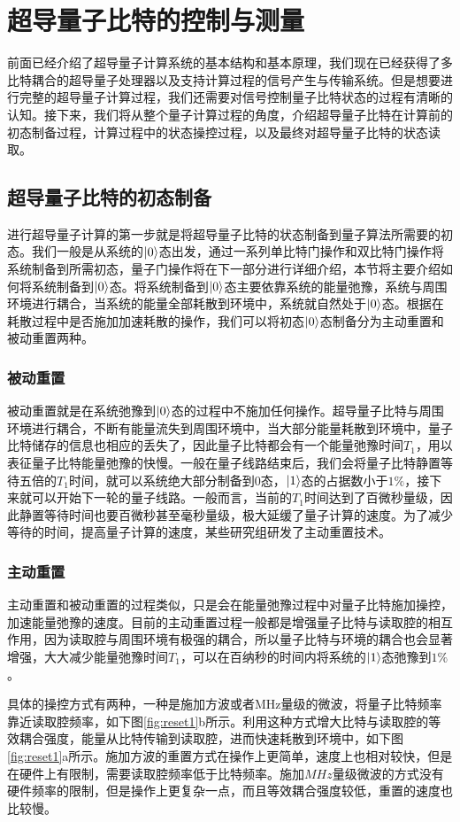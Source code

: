 \chapter{超导量子比特的控制与测量}
前面已经介绍了超导量子计算系统的基本结构和基本原理，我们现在已经获得了多比特耦合的超导量子处理器以及支持计算过程的信号产生与传输系统。但是想要进行完整的超导量子计算过程，我们还需要对信号控制量子比特状态的过程有清晰的认知。接下来，我们将从整个量子计算过程的角度，介绍超导量子比特在计算前的初态制备过程，计算过程中的状态操控过程，以及最终对超导量子比特的状态读取。
\section{超导量子比特的初态制备}
进行超导量子计算的第一步就是将超导量子比特的状态制备到量子算法所需要的初态。我们一般是从系统的$\left|0\right>$态出发，通过一系列单比特门操作和双比特门操作将系统制备到所需初态，量子门操作将在下一部分进行详细介绍，本节将主要介绍如何将系统制备到$\left|0\right>$态。将系统制备到$\left|0\right>$态主要依靠系统的能量弛豫，系统与周围环境进行耦合，当系统的能量全部耗散到环境中，系统就自然处于$\left|0\right>$态。根据在耗散过程中是否施加加速耗散的操作，我们可以将初态$\left|0\right>$态制备分为主动重置和被动重置两种。
\subsection{被动重置}
被动重置就是在系统弛豫到$\left|0\right>$态的过程中不施加任何操作。超导量子比特与周围环境进行耦合，不断有能量流失到周围环境中，当大部分能量耗散到环境中，量子比特储存的信息也相应的丢失了，因此量子比特都会有一个能量弛豫时间$T_{1}$，用以表征量子比特能量弛豫的快慢。一般在量子线路结束后，我们会将量子比特静置等待五倍的$T_{1}$时间，就可以系统绝大部分制备到0态，$\left|1\right>$态的占据数小于$1\% $，接下来就可以开始下一轮的量子线路。一般而言，当前的$T_{1}$时间达到了百微秒量级，因此静置等待时间也要百微秒甚至毫秒量级，极大延缓了量子计算的速度。为了减少等待的时间，提高量子计算的速度，某些研究组研发了主动重置技术。

\subsection{主动重置}
主动重置和被动重置的过程类似，只是会在能量弛豫过程中对量子比特施加操控，加速能量弛豫的速度。目前的主动重置过程一般都是增强量子比特与读取腔的相互作用，因为读取腔与周围环境有极强的耦合，所以量子比特与环境的耦合也会显著增强，大大减少能量弛豫时间$T_{1}$，可以在百纳秒的时间内将系统的$\left|1\right>$态弛豫到$1\% $。

具体的操控方式有两种，一种是施加方波或者MHz量级的微波，将量子比特频率靠近读取腔频率，如下图\ref{fig:reset1}b所示。利用这种方式增大比特与读取腔的等效耦合强度，能量从比特传输到读取腔，进而快速耗散到环境中，如下图\ref{fig:reset1}a所示。施加方波的重置方式在操作上更简单，速度上也相对较快，但是在硬件上有限制，需要读取腔频率低于比特频率。施加$MHz$量级微波的方式没有硬件频率的限制，但是操作上更复杂一点，而且等效耦合强度较低，重置的速度也比较慢。

